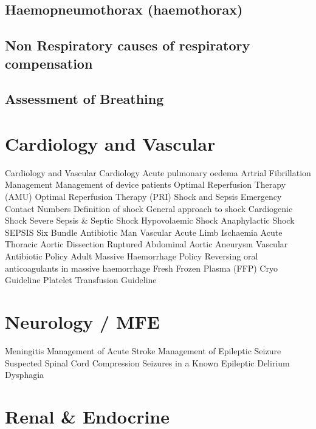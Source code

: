 \documentclass[]{book}
\begin{document}
\hypertarget{haemopneumothorax-haemothorax}{%
\section{Haemopneumothorax (haemothorax)}\label{haemopneumothorax-haemothorax}}

\hypertarget{non-respiratory-causes-of-respiratory-compensation}{%
\section{Non Respiratory causes of respiratory compensation}\label{non-respiratory-causes-of-respiratory-compensation}}

\hypertarget{assessment-of-breathing}{%
\section{Assessment of Breathing}\label{assessment-of-breathing}}

\hypertarget{cardiovasc}{%
\chapter{Cardiology and Vascular}\label{cardiovasc}}

Cardiology and Vascular
Cardiology
Acute pulmonary oedema
Artrial Fibrillation Management
Management of device patients
Optimal Reperfusion Therapy (AMU)
Optimal Reperfusion Therapy (PRI)
Shock and Sepsis
Emergency Contact Numbers
Definition of shock
General approach to shock
Cardiogenic Shock
Severe Sepsis \& Septic Shock
Hypovolaemic Shock
Anaphylactic Shock
SEPSIS Six Bundle
Antibiotic Man
Vascular
Acute Limb Ischaemia
Acute Thoracic Aortic Dissection
Ruptured Abdominal Aortic Aneurysm
Vascular Antibiotic Policy
Adult Massive Haemorrhage Policy
Reversing oral anticoagulants in massive haemorrhage
Fresh Frozen Plasma (FFP) Cryo Guideline
Platelet Transfusion Guideline

\hypertarget{neuromfe}{%
\chapter{Neurology / MFE}\label{neuromfe}}

Meningitis
Management of Acute Stroke
Management of Epileptic Seizure
Suspected Spinal Cord Compression
Seizures in a Known Epileptic
Delirium
Dysphagia

\hypertarget{renal-endocrine}{%
\chapter{Renal \& Endocrine}\label{renal-endocrine}}
\end{document}
